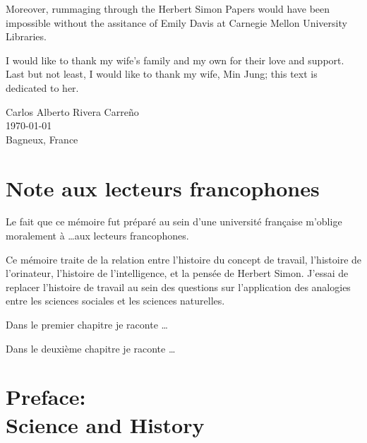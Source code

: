 Moreover, rummaging through the Herbert Simon Papers would have been
impossible without the assitance of Emily Davis at Carnegie Mellon
University Libraries.

I would like to thank my wife's family and my own for their love and
support. Last but not least, I would like to thank my wife, Min Jung; this
text is dedicated to her.

\vspace{2\baselineskip}
\begin{FlushRight}
  Carlos Alberto Rivera Carreño\\
  \today\\
  Bagneux, France
\end{FlushRight}



\chapter{Note aux lecteurs francophones} 
Le fait que ce mémoire fut préparé au sein d'une université française
m'oblige moralement à \ldots aux lecteurs francophones. 

Ce mémoire traite de la relation entre l'histoire du concept de travail,
l'histoire de l'orinateur, l'histoire de l'intelligence, et la pensée de
Herbert Simon. J'essai de replacer l'histoire de travail au sein des
questions sur  l'application des analogies entre les sciences sociales et
les sciences naturelles.  

Dans le premier chapitre je raconte \ldots 

Dans le deuxième chapitre je raconte \ldots 

\lipsum

\chapter[Preface]{Preface:\\ Science and History} 

\lipsum
\mainmatter
\pagestyle{scrheadings}